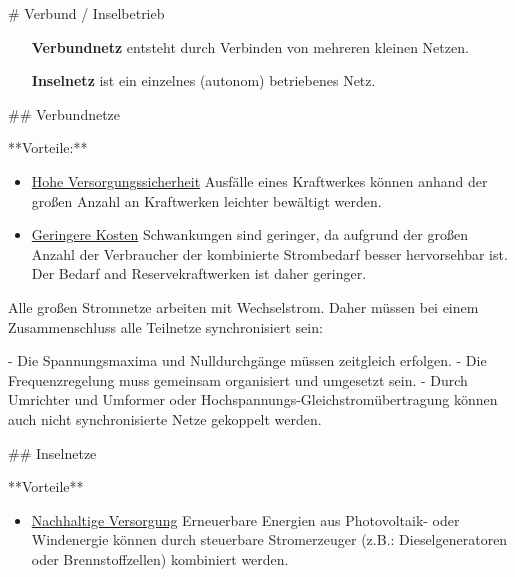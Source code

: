 \begin{markdown}

# Verbund / Inselbetrieb

\begin{itemize}
    \item[\textbf{Verbundnetz}] entsteht durch Verbinden von mehreren kleinen Netzen.
    \item[\textbf{Inselnetz}] ist ein einzelnes (autonom) betriebenes Netz. 
\end{itemize}

## Verbundnetze


**Vorteile:**

\begin{itemize}
    \item \underline{Hohe Versorgungssicherheit}
    \newline Ausfälle eines Kraftwerkes können anhand der großen Anzahl an Kraftwerken leichter bewältigt werden.
    \item \underline{Geringere Kosten}
    \newline Schwankungen sind geringer, da aufgrund der großen Anzahl der Verbraucher der kombinierte Strombedarf besser hervorsehbar ist.
    \newline Der Bedarf and Reservekraftwerken ist daher geringer.
\end{itemize}

Alle großen Stromnetze arbeiten mit Wechselstrom. Daher müssen bei einem Zusammenschluss alle Teilnetze synchronisiert sein:

- Die Spannungsmaxima und Nulldurchgänge müssen zeitgleich erfolgen.
- Die Frequenzregelung muss gemeinsam organisiert und umgesetzt sein.
- Durch Umrichter und Umformer oder Hochspannungs-Gleichstromübertragung können auch nicht synchronisierte Netze gekoppelt werden.


## Inselnetze

**Vorteile**

\begin{itemize}
    \item \underline{Nachhaltige Versorgung}
    \newline Erneuerbare Energien aus Photovoltaik- oder Windenergie können durch steuerbare Stromerzeuger (z.B.: Dieselgeneratoren oder Brennstoffzellen) kombiniert werden.
\end{itemize}


\end{markdown}
